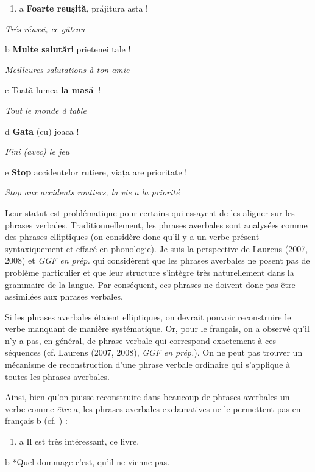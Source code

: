 \begin{enumerate}
\item \label{bkm:Ref305619139}a  \textbf{Foarte reuşită}, prăjitura asta !


\end{enumerate}
\textit{  Trés réussi, ce gâteau}  

  b  \textbf{Multe salutări} prietenei tale !

    \textit{Meilleures salutations à ton amie}  

c  Toată lumea \textbf{la masă~}!

  \textit{Tout le monde à table}

d  \textbf{Gata} (cu) joaca !  

{\itshape
Fini (avec) le jeu}

  e  \textbf{Stop} accidentelor rutiere, viața are prioritate !

\textit{    Stop aux accidents routiers, la vie a la priorité}  

Leur statut est problématique pour certains qui essayent de les aligner sur les phrases verbales. Traditionnellement, les phrases averbales sont analysées comme des phrases elliptiques (on considère donc qu'il y a un verbe présent syntaxiquement et effacé en phonologie). Je suis la perspective de Laurens (2007, 2008) et \textit{GGF en prép.} qui considèrent que les phrases averbales ne posent pas de problème particulier et que leur structure s'intègre très naturellement dans la grammaire de la langue. Par conséquent, ces phrases ne doivent donc pas être assimilées aux phrases verbales. 

Si les phrases averbales étaient elliptiques, on devrait pouvoir reconstruire le verbe manquant de manière systématique. Or, pour le français, on a observé qu'il n'y a pas, en général, de phrase verbale qui correspond exactement à ces séquences (cf. Laurens (2007, 2008), \textit{GGF} \textit{en prép.}). On ne peut pas trouver un mécanisme de reconstruction d'une phrase verbale ordinaire qui s'applique à toutes les phrases averbales. 

Ainsi, bien qu'on puisse reconstruire dans beaucoup de phrases averbales un verbe comme \textit{être} a, les phrases averbales exclamatives ne le permettent pas en français b (cf. \citet{Laurens2008}) :


\begin{enumerate}
\item \label{bkm:Ref302645069}a  Il est très intéressant, ce livre.  


\end{enumerate}
b  *Quel dommage c'est, qu'il ne vienne pas.


